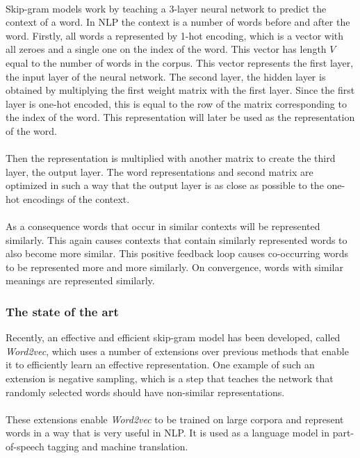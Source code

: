 \documentclass{article}
\begin{document}
 \paragraph{}
 Skip-gram models work by teaching a 3-layer neural network to predict the context of a word. In NLP the context is a number of words before and after the word. Firstly, all words a represented by 1-hot encoding, which is a vector with all zeroes and a single one on the index of the word. This vector has length $V$ equal to the number of words in the corpus. This vector represents the first layer, the input layer of the neural network. The second layer, the hidden layer is obtained by multiplying the first weight matrix with the first layer. Since the first layer is one-hot encoded, this is equal to the row of the matrix corresponding to the index of the word. This representation will later be used as the representation of the word.
 \paragraph{}
 Then the representation is multiplied with another matrix to create the third layer, the output layer. The word representations and second matrix are optimized in such a way that the output layer is as close as possible to the one-hot encodings of the context.
 \paragraph{}
 As a consequence words that occur in similar contexts will be represented similarly. This again causes contexts that contain similarly represented words to also become more similar. This positive feedback loop causes co-occurring words to be represented more and more similarly. On convergence, words with similar meanings are represented similarly.
 
 \subsubsection{The state of the art}
 Recently, an effective and efficient skip-gram model has been developed, called \emph{Word2vec}, which uses a number of extensions over previous methods that enable it to efficiently learn an effective representation\cite{w2v}. One example of such an extension is negative sampling, which is a step that teaches the network that randomly selected words should have non-similar representations.
 \paragraph{}
 These extensions enable \emph{Word2vec} to be trained on large corpora and represent words in a way that is very useful in NLP. It is used as a language model in part-of-speech tagging and machine translation.
\end{document}
